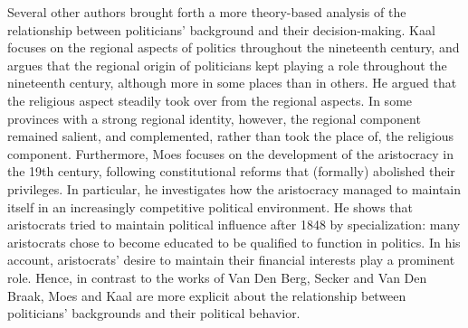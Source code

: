     Several other authors brought forth a more theory-based analysis of the relationship between politicians' background and their decision-making. Kaal focuses on the regional aspects of politics throughout the nineteenth century, and argues that the regional origin of politicians kept playing a role throughout the nineteenth century, although more in some places than in others.\autocite{kaal2016politics} He argued that the religious aspect steadily took over from the regional aspects. %
    In some provinces with a strong regional identity, however, the regional component remained salient, and complemented, rather than took the place of, the religious component. Furthermore, Moes focuses on the development of the aristocracy in the 19th century, following constitutional reforms that (formally) abolished their privileges.\autocite{moes2012onder} In particular, he investigates %
    how the aristocracy managed to maintain itself in an increasingly competitive political environment. He shows that aristocrats tried to maintain political influence after 1848 by specialization: many aristocrats chose to become educated to be qualified to function in politics. In his account, aristocrats' desire to maintain their financial interests play a prominent role. 
    Hence, in contrast to the works of Van Den Berg, Secker and Van Den Braak, Moes and Kaal are more explicit about the relationship between politicians' backgrounds and their political behavior. %

